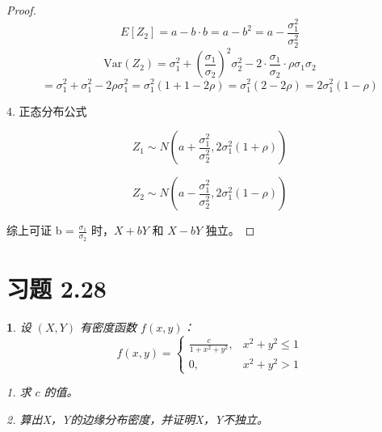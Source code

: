 \documentclass[UTF8]{report}
\theoremstyle{MyLineTheoremStyle} %
\theoremstyle{MyBlockTheoremStyle} %
\theoremstyle{MySubsubsectionStyle} %
\newtheorem{definition}{}
\begin{document}
\begin{proof}
\[
E[Z_2] = a - b \cdot b = a - b^2 = a - \frac{\sigma_1^2}{\sigma_2^2}
\]
\[
\text{Var}(Z_2) = \sigma_1^2 + \left(\frac{\sigma_1}{\sigma_2}\right)^2\sigma_2^2 - 2 \cdot \frac{\sigma_1}{\sigma_2} \cdot \rho\sigma_1\sigma_2
\]
\[
= \sigma_1^2 + \sigma_1^2 - 2\rho\sigma_1^2 = \sigma_1^2(1 + 1 - 2\rho) = \sigma_1^2(2 - 2\rho) = 2\sigma_1^2(1 - \rho)
\]

4. 正态分布公式

\[
Z_1 \sim N\left(a + \frac{\sigma_1^2}{\sigma_2^2}, 2\sigma_1^2(1 + \rho)\right)
\]

\[
Z_2 \sim N\left(a - \frac{\sigma_1^2}{\sigma_2^2}, 2\sigma_1^2(1 - \rho)\right)
\]

综上可证 b = $\frac{\sigma_1}{\sigma_2}$ 时，$X + bY$ 和 $X - bY$ 独立。
\end{proof}
    

\section{习题 2.28}

\begin{definition}
    设 $(X, Y)$ 有密度函数 $f(x, y)$：
    \[
    f(x, y) =
    \begin{cases}
    \frac{c}{1 + x^2 + y^2}, & x^2 + y^2 \leq 1 \\
    0, & x^2 + y^2 > 1
    \end{cases}
    \]\par
    1. 求 $c$ 的值。\par
    2. 算出X，Y的边缘分布密度，并证明X，Y不独立。\par
\end{definition}
\end{document}
